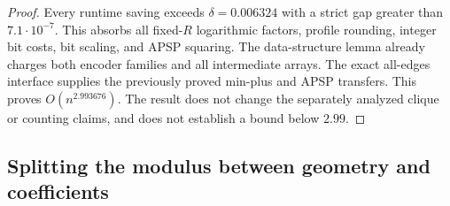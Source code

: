 \documentclass[11pt]{article}
\begin{document}
\begin{proof}
Every runtime saving exceeds $\delta=0.006324$ with a strict gap greater
than $7.1\cdot10^{-7}$. This absorbs all fixed-$R$ logarithmic factors,
profile rounding, integer bit costs, bit scaling, and APSP squaring.
The data-structure lemma already charges both encoder families and all
intermediate arrays. The exact all-edges interface supplies the previously
proved min-plus and APSP transfers. This proves $O(n^{2.993676})$.
The result does not change the separately analyzed clique or counting
claims, and does not establish a bound below $2.99$.
\end{proof}

\subsection*{Splitting the modulus between geometry and coefficients}
\end{document}
